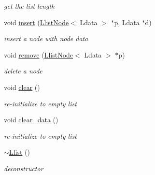 \begin{CompactItemize}
\begin{CompactList}\small\item\em get the list length \item\end{CompactList}\item 
\hypertarget{classLlist_62d2c41eb7e240d74de37f15fb31717a}{
void \hyperlink{classLlist_62d2c41eb7e240d74de37f15fb31717a}{insert} (\hyperlink{classLlistNode}{LlistNode}$<$ Ldata $>$ $\ast$p, Ldata $\ast$d)}
\label{classLlist_62d2c41eb7e240d74de37f15fb31717a}

\begin{CompactList}\small\item\em insert a node with node data \item\end{CompactList}\item 
\hypertarget{classLlist_978a0ea9a47f2b809d8626a6261eb5f6}{
void \hyperlink{classLlist_978a0ea9a47f2b809d8626a6261eb5f6}{remove} (\hyperlink{classLlistNode}{LlistNode}$<$ Ldata $>$ $\ast$p)}
\label{classLlist_978a0ea9a47f2b809d8626a6261eb5f6}

\begin{CompactList}\small\item\em delete a node \item\end{CompactList}\item 
\hypertarget{classLlist_27c7c4149e117b782289c2d5bc965635}{
void \hyperlink{classLlist_27c7c4149e117b782289c2d5bc965635}{clear} ()}
\label{classLlist_27c7c4149e117b782289c2d5bc965635}

\begin{CompactList}\small\item\em re-initialize to empty list \item\end{CompactList}\item 
\hypertarget{classLlist_09061ffe39434195d24e86dc1c53a047}{
void \hyperlink{classLlist_09061ffe39434195d24e86dc1c53a047}{clear\_\-data} ()}
\label{classLlist_09061ffe39434195d24e86dc1c53a047}

\begin{CompactList}\small\item\em re-initialize to empty list \item\end{CompactList}\item 
\hypertarget{classLlist_f9d773bb9b844be5ff4a4bfb449cd0c9}{
\hyperlink{classLlist_f9d773bb9b844be5ff4a4bfb449cd0c9}{$\sim$Llist} ()}
\label{classLlist_f9d773bb9b844be5ff4a4bfb449cd0c9}

\begin{CompactList}\small\item\em deconstructor \item\end{CompactList}\end{CompactItemize}
